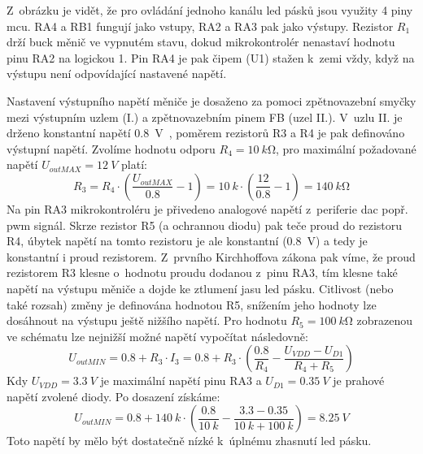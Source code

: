     Z~obrázku je vidět, že pro ovládání jednoho kanálu \acs{led} pásků jsou využity 4 piny \acs{mcu}. RA4 a RB1 fungují jako vstupy, RA2 a RA3 pak jako výstupy. Rezistor \(R_{1}\) drží buck měnič ve vypnutém stavu, dokud mikrokontrolér nenastaví hodnotu pinu RA2 na logickou 1. Pin RA4 je pak čipem (U1) stažen k~zemi vždy, když na výstupu není odpovídající nastavené napětí.  
    
    Nastavení výstupního napětí měniče je dosaženo za pomoci zpětnovazební smyčky mezi výstupním uzlem (I.) a zpětnovazebním pinem FB (uzel II.). V~uzlu II. je drženo konstantní napětí \qty{0.8}{V}~\cite{Diodes_AP63356Q}, poměrem rezistorů R3 a R4 je pak definováno výstupní napětí. Zvolíme hodnotu odporu \(R_{4} = \qty{10}{k\ohm}\), pro maximální požadované napětí \(U_{outMAX} = \qty{12}{V}\) platí:
    \begin{equation}
        R_{3} = R_{4}\cdot \left(\frac{U_{outMAX} }{\num{0.8}}-1\right) = \qty{10}{k}\cdot \left(\frac{12}{\num{0.8}}-1\right) = \qty{140}{k\ohm}
    \end{equation} 
    Na pin RA3 mikrokontroléru je přivedeno analogové napětí z~periferie \acs{dac} popř. \acs{pwm} signál. Skrze rezistor R5 (a ochrannou diodu) pak teče proud do rezistoru R4, úbytek napětí na tomto rezistoru je ale konstantní (\qty{0.8}{V}) a tedy je konstantní i proud rezistorem. Z~prvního Kirchhoffova zákona pak víme, že proud rezistorem R3 klesne o~hodnotu proudu dodanou z~pinu RA3, tím klesne také napětí na výstupu měniče a dojde ke ztlumení jasu \acs{led} pásku. Citlivost (nebo také rozsah) změny je definována hodnotou R5, snížením jeho hodnoty lze dosáhnout na výstupu ještě nižšího napětí. Pro hodnotu \(R_{5} = \qty{100}{k\ohm}\) zobrazenou ve schématu lze nejnižší možné napětí vypočítat následovně:
    \begin{equation}
        U_{outMIN} = \num{0.8}+R_{3} \cdot I_{3} = \num{0.8}+R_{3} \cdot \left(\frac{\num{0.8}}{R_{4}} - \frac{U_{VDD} - U_{D1}}{R_{4}+R_{5}} \right) 
    \end{equation}  
    Kdy \(U_{VDD} = \qty{3.3}{V}\) je maximální napětí pinu RA3 a \(U_{D1}=\qty{0.35}{V} \) je prahové napětí zvolené diody. Po dosazení získáme:
    \begin{equation}
        U_{outMIN} = \num{0.8}+\qty{140}{k} \cdot \left(\frac{\num{0.8}}{\qty{10}{k}} - \frac{\num{3.3} - \num{0.35}}{\qty{10}{k}+\qty{100}{k}} \right) = \qty{8.25}{V}
    \end{equation}  
    Toto napětí by mělo být dostatečně nízké k~úplnému zhasnutí \acs{led} pásku.

